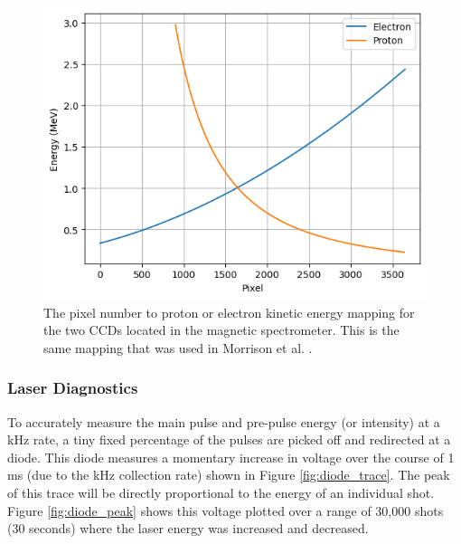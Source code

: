 \begin{figure}
	\centering 
	\includegraphics[width=0.75\linewidth]{planning/images/daq/pixel.png}
	\caption{The pixel number to proton or electron kinetic energy mapping for the two CCDs located in the magnetic spectrometer. This is the same mapping that was used in Morrison et al. \cite{Morrison_2018_NJoP}.}
	\label{fig:pixel_energy}
\end{figure}

\subsubsection{Laser Diagnostics}
To accurately measure the main pulse and pre-pulse energy (or intensity) at a kHz rate, a tiny fixed percentage of the pulses are picked off and redirected at a diode. This diode measures a momentary increase in voltage over the course of 1 ms (due to the kHz collection rate) shown in Figure \autoref{fig:diode_trace}. The peak of this trace will be directly proportional to the energy of an individual shot. Figure \autoref{fig:diode_peak} shows this voltage plotted over a range of 30,000 shots (30 seconds) where the laser energy was increased and decreased.

